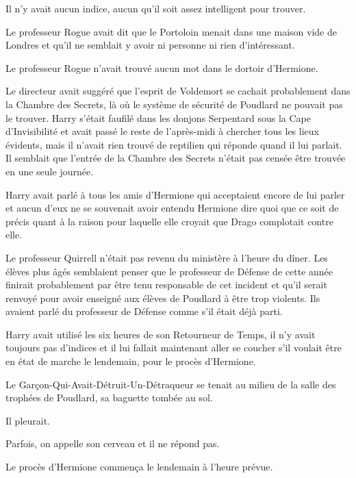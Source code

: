 Il n'y avait aucun indice, aucun qu'il soit assez intelligent pour trouver.

Le professeur Rogue avait dit que le Portoloin menait dans une maison vide de Londres et qu'il ne semblait y avoir ni personne ni rien d'intéressant.

Le professeur Rogue n'avait trouvé aucun mot dans le dortoir d'Hermione.

Le directeur avait suggéré que l'esprit de Voldemort se cachait probablement dans la Chambre des Secrets, là où le système de sécurité de Poudlard ne pouvait pas le trouver. Harry s'était faufilé dans les donjons Serpentard sous la Cape d'Invisibilité et avait passé le reste de l'après-midi à chercher tous les lieux évidents, mais il n'avait rien trouvé de reptilien qui réponde quand il lui parlait. Il semblait que l'entrée de la Chambre des Secrets n'était pas censée être trouvée en une seule journée.

Harry avait parlé à tous les amis d'Hermione qui acceptaient encore de lui parler et aucun d'eux ne se souvenait avoir entendu Hermione dire quoi que ce soit de précis quant à la raison pour laquelle elle croyait que Drago complotait contre elle.

Le professeur Quirrell n'était pas revenu du ministère à l'heure du dîner. Les élèves plus âgés semblaient penser que le professeur de Défense de cette année finirait probablement par être tenu responsable de cet incident et qu'il serait renvoyé pour avoir enseigné aux élèves de Poudlard à être trop violents. Ils avaient parlé du professeur de Défense comme s'il était déjà parti.

Harry avait utilisé les six heures de son Retourneur de Temps, il n'y avait toujours pas d'indices et il lui fallait maintenant aller se coucher s'il voulait être en état de marche le lendemain, pour le procès d'Hermione.

Le Garçon-Qui-Avait-Détruit-Un-Détraqueur se tenait au milieu de la salle des trophées de Poudlard, sa baguette tombée au sol.

Il pleurait.

Parfois, on appelle son cerveau et il ne répond pas.

Le procès d'Hermione commença le lendemain à l'heure prévue.
